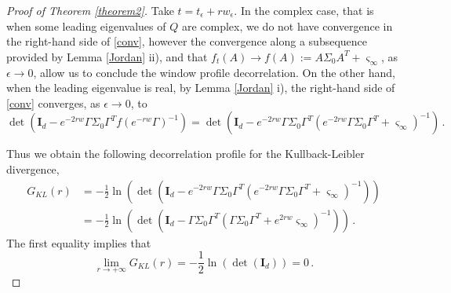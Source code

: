 \documentclass[12pt,thmsa]{article}
\begin{document}
\begin{proof}[Proof of Theorem \ref{theorem2}]
	Take $t=t_\epsilon+ rw_\epsilon$. In the complex case, that is when some leading eigenvalues of $Q$ are complex, we do not have convergence in the right-hand side of \eqref{conv}, however the convergence along a subsequence provided by Lemma \ref{Jordan} ii), and that $f_t(A)\to f(A):=A\Sigma_0A^T+\varsigma_{\infty}$, as $\epsilon\to 0$, allow us to conclude the window profile decorrelation. On the other hand, when the leading eigenvalue is real, by Lemma \ref{Jordan} i), the right-hand side of \eqref{conv} converges, as $\epsilon\to 0$,  to $$ \det\left( \mathbf{I}_d- e^{-2rw}\Gamma\Sigma_0\Gamma^Tf\left(e^{-rw}\Gamma\right)^{-1}\right)=\det\left( \mathbf{I}_d- e^{-2rw}\Gamma\Sigma_0\Gamma^T\left(e^{-2rw}\Gamma\Sigma_0\Gamma^T+ \varsigma_{\infty} \right)^{-1}\right)\,.$$
	
	Thus we obtain the following decorrelation profile for the Kullback-Leibler divergence,
	\[
	\begin{split}
		G_{KL}(r)&=-\frac{1}{2}\ln\left( \det\left( \mathbf{I}_d- e^{-2rw}\Gamma\Sigma_0\Gamma^T\left(e^{-2rw}\Gamma\Sigma_0\Gamma^T+ \varsigma_{\infty} \right)^{-1}\right)\right)\\
		&= -\frac{1}{2}\ln\left(\det\left( \mathbf{I}_d- \Gamma\Sigma_0\Gamma^T\left(\Gamma\Sigma_0\Gamma^T+ e^{2rw}\varsigma_{\infty} \right)^{-1}\right) \right)\,.
	\end{split}
	\]
	The first equality implies that  
	$$\lim_{r\to+\infty}G_{KL}(r)=-\frac{1}{2}\ln\left( \det\left( \mathbf{I}_d\right)\right)=0\,. $$
	

\end{proof}
\end{document}
